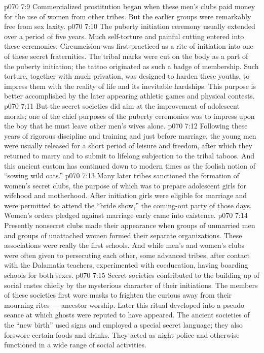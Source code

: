 \vs p070 7:9 Commercialized prostitution began when these men’s clubs paid money for the use of women from other tribes. But the earlier groups were remarkably free from sex laxity.
\vs p070 7:10 The puberty initiation ceremony usually extended over a period of five years. Much self\hyp{}torture and painful cutting entered into these ceremonies. Circumcision was first practiced as a rite of initiation into one of these secret fraternities. The tribal marks were cut on the body as a part of the puberty initiation; the tattoo originated as such a badge of membership. Such torture, together with much privation, was designed to harden these youths, to impress them with the reality of life and its inevitable hardships. This purpose is better accomplished by the later appearing athletic games and physical contests.
\vs p070 7:11 But the secret societies did aim at the improvement of adolescent morals; one of the chief purposes of the puberty ceremonies was to impress upon the boy that he must leave other men’s wives alone.
\vs p070 7:12 Following these years of rigorous discipline and training and just before marriage, the young men were usually released for a short period of leisure and freedom, after which they returned to marry and to submit to lifelong subjection to the tribal taboos. And this ancient custom has continued down to modern times as the foolish notion of “sowing wild oats.”
\vs p070 7:13 \pc Many later tribes sanctioned the formation of women’s secret clubs, the purpose of which was to prepare adolescent girls for wifehood and motherhood. After initiation girls were eligible for marriage and were permitted to attend the “bride show,” the coming\hyp{}out party of those days. Women’s orders pledged against marriage early came into existence.
\vs p070 7:14 Presently nonsecret clubs made their appearance when groups of unmarried men and groups of unattached women formed their separate organizations. These associations were really the first schools. And while men’s and women’s clubs were often given to persecuting each other, some advanced tribes, after contact with the Dalamatia teachers, experimented with coeducation, having boarding schools for both sexes.
\vs p070 7:15 \pc Secret societies contributed to the building up of social castes chiefly by the mysterious character of their initiations. The members of these societies first wore masks to frighten the curious away from their mourning rites --- ancestor worship. Later this ritual developed into a pseudo seance at which ghosts were reputed to have appeared. The ancient societies of the “new birth” used signs and employed a special secret language; they also forswore certain foods and drinks. They acted as night police and otherwise functioned in a wide range of social activities.
